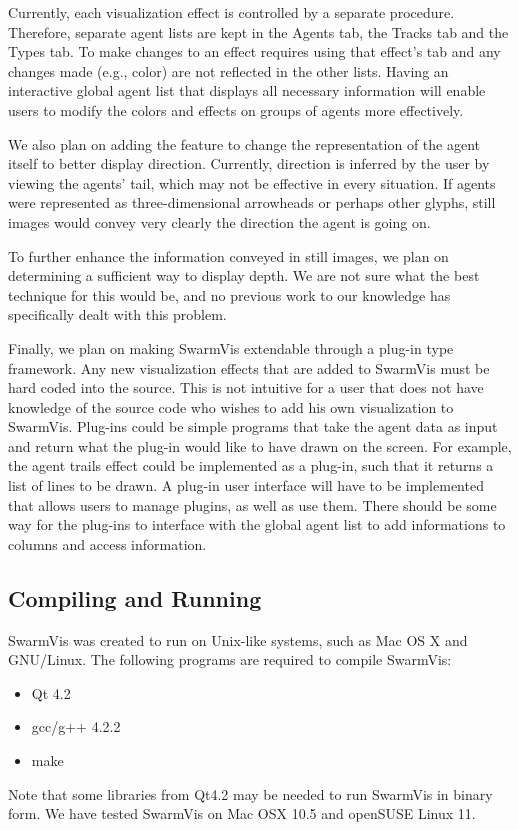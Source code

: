 \documentclass[conference]{IEEEtran}
\begin{document}
Currently, each visualization effect is controlled by a separate procedure.
Therefore, separate agent lists are kept in the Agents tab, the Tracks tab and the Types tab.
To make changes to an effect requires using that effect's tab and any changes made (e.g., color) are not reflected in the other lists.
Having an interactive global agent list that displays all necessary information will enable users to modify
the colors and effects on groups of agents more effectively. 

We also plan on adding the feature to change the representation of the agent itself to better display direction. Currently, direction is
inferred by the user by viewing the agents' tail, which may not be effective in every situation.
If agents were represented as three-dimensional arrowheads or perhaps other glyphs,
still images would convey very clearly the direction the agent is going on.

To further enhance the information conveyed in still images, we plan on determining a sufficient way to display depth.
We are not sure what the best technique for this would be, and no previous work to our knowledge has specifically dealt with this problem.

Finally, we plan on making SwarmVis extendable through a plug-in type framework. Any new visualization effects that are added
to SwarmVis must be hard coded into the source. This is not intuitive for a user that does not have knowledge of the source code
who wishes to add his own visualization to SwarmVis. Plug-ins could be simple programs that take the agent data as input and return
what the plug-in would like to have drawn on the screen. For example, the agent trails effect could be implemented as a plug-in, such
that it returns a list of lines to be drawn. A plug-in user interface will have to be implemented that allows users to manage plugins,
as well as use them. There should be some way for the plug-ins to interface with the global agent list to add informations to columns
and access information.






\subsection{Compiling and Running}
SwarmVis was created to run on Unix-like systems, such as Mac OS X and GNU/Linux.
The following programs are required to compile SwarmVis:
\begin{itemize}
\item Qt 4.2
\item gcc/g++ 4.2.2
\item make
\end{itemize}
Note that some libraries from Qt4.2 may be needed to run SwarmVis in binary form.
We have tested SwarmVis on Mac OSX 10.5 and openSUSE Linux 11.
\end{document}
